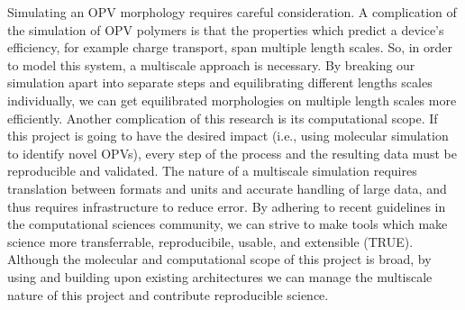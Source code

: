 Simulating an OPV morphology requires careful consideration. %
A complication of the simulation of OPV polymers is that the properties which predict a device's efficiency, for example charge transport, span multiple length scales.
So, in order to model this system, a multiscale approach is necessary.
By breaking our simulation apart into separate steps and equilibrating different lengths scales individually, we can get equilibrated morphologies on multiple length scales more efficiently.
Another complication of this research is its computational scope.
If this project is going to have the desired impact (i.e., using molecular simulation to identify novel OPVs), every step of the process and the resulting data must be reproducible and validated.
The nature of a multiscale simulation requires translation between formats and units and accurate handling of large data, and thus requires infrastructure to reduce error.
By adhering to recent guidelines in the computational sciences community, we can strive to make tools which make science more transferrable, reproducibile, usable, and extensible (TRUE)\cite{Thompson2020}.
Although the molecular and computational scope of this project is broad, by using and building upon existing architectures we can manage the multiscale nature of this project and contribute reproducible science. %

